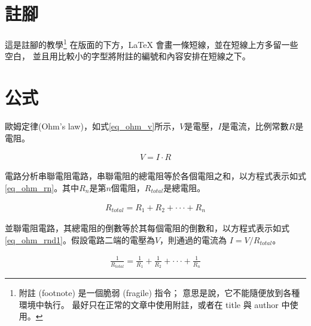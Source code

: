 
\newpage
\section{註腳}
這是註腳的教學\footnote{附註 (footnote) 是一個脆弱 (fragile) 指令； 意思是說，它不能隨便放到各種環境中執行。 最好只在正常的文章中使用附註，或者在 title 與 author 中使用。}
在版面的下方，LaTeX 會畫一條短線，並在短線上方多留一些空白， 並且用比較小的字型將附註的編號和內容安排在短線之下。
\newpage

\section{公式}

歐姆定律(Ohm's law)，如式\ref{eq_ohm_v}所示，$V$是電壓，$I$是電流，比例常數$R$是電阻。

\begin{equation}\label{eq_ohm_v}
    \begin{split}
        V = I \cdot R
    \end{split}
\end{equation}

電路分析串聯電阻電路，串聯電阻的總電阻等於各個電阻之和，以方程式表示如式\ref{eq_ohm_rn}。其中$R_{n}$是第$n$個電阻，$R_{total}$是總電阻。

\begin{equation}\label{eq_ohm_rn}
    \begin{split}
        R_{total} = R_{1} + R_{2} + \cdot\cdot\cdot + R_{n}
    \end{split}
\end{equation}

並聯電阻電路，其總電阻的倒數等於其每個電阻的倒數和，以方程式表示如式\ref{eq_ohm_rnd1}。假設電路二端的電壓為$V$，則通過的電流為 $I = V / R_{total}$。

\begin{equation}\label{eq_ohm_rnd1}
    \begin{split}
        \frac{1}{R_{total}} = \frac{1}{R_{1}} + \frac{1}{R_{2}} + \cdot\cdot\cdot + \frac{1}{R_{n}}
    \end{split}
\end{equation}

